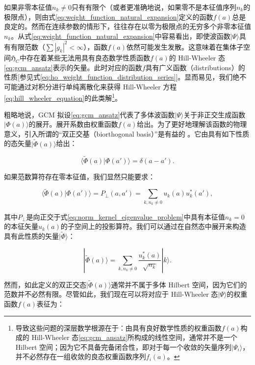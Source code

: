 如果非零本征值$n_{k}\neq0$只有有限个（或者更准确地说，如果零不是本征值序列$n_{k}$的极限点），则由式\ref{eq:weight_function_natural_expansion}定义的函数$f(a)$总是良定的。然而在连续参数的情形下，往往存在以零为极限点的无穷多个非零本征值$n_{k}$。从式\ref{eq:weight_function_natural_expansion}中容易看出，即使波函数$|\Psi\rangle$具有有限范数（$\sum|g_{k}|^{2}<\infty$），函数$f(a)$依然可能发生发散。这意味着在集体子空间$\mathfrak{H}_{C}$中存在着某些无法用具有良态数学性质函数$f(a)$的
Hill-Wheeler 态\ref{eq:gcm_ansatz}表示的矢量。此时对应的函数$f$具有广义函数（distributions）的性质{[}参见式\ref{eq:ho_weight_function_distribution_series}{]}。显而易见，我们绝不可能通过对积分进行单纯离散化来获得
Hill-Wheeler 方程\ref{eq:hill_wheeler_equation}的此类解\footnote{导致这些问题的深层数学根源在于：由具有良好数学性质的权重函数$f(a)$构成的 Hill-Wheeler 态\ref{eq:gcm_ansatz}所构成的线性空间，通常并不是一个
Hilbert 空间；因为它不具备完备闭合性，即对于每一个收敛的矢量序列$|\Psi_{i}\rangle$，并不必然存在一组收敛的良态权重函数序列$f_{i}(a)$。}。

粗略地说，GCM 拟设\ref{eq:gcm_ansatz}代表了多体波函数$|\Psi\rangle$关于非正交生成函数$|\Phi(a)\rangle$的展开。展开系数由权重函数$f(a)$给出。为了更好地理解该函数的物理意义，引入所谓的``双正交基（biorthogonal
basis）''是有益的 \cite{Wo70}。它由具有如下性质的态矢量$|\tilde{\Phi}(a)\rangle$给出：

\begin{equation}
\langle\tilde{\Phi}(a)|\Phi(a')\rangle=\delta(a-a').\label{eq:biorthogonal_basis_property}
\end{equation}

如果范数算符存在零本征值，我们显然只能要求：

\begin{equation}
\langle\tilde{\Phi}(a)|\Phi(a')\rangle=P_{\perp}(a,a')=\sum_{k,n_{k}\neq0}u_{k}(a)u^{*}_{k}(a'),\label{eq:biorthogonal_projection_property}
\end{equation}

其中$P_{\perp}$是向正交于式\ref{eq:norm_kernel_eigenvalue_problem}中具有本征值$n_{k}=0$的本征矢量$u_{k}(a)$的子空间上的投影算符。我们可以通过在自然态中展开来构造具有此性质的矢量$|\tilde{\Phi}\rangle$：

\begin{equation}
|\tilde{\Phi}(a)\rangle=\sum_{k,n_{k}\neq0}\frac{u^{*}_{k}(a)}{\sqrt{n_{k}}}|k\rangle.\label{eq:biorthogonal_states_natural_expansion}
\end{equation}

然而，如此定义的双正交态$|\tilde{\Phi}(a)\rangle$通常并不属于多体 Hilbert 空间，因为它们的范数并不必然有限。尽管如此，我们现在可以将对应于
Hill-Wheeler 态$|\Psi\rangle$的权重函数$f(a)$表征为：

